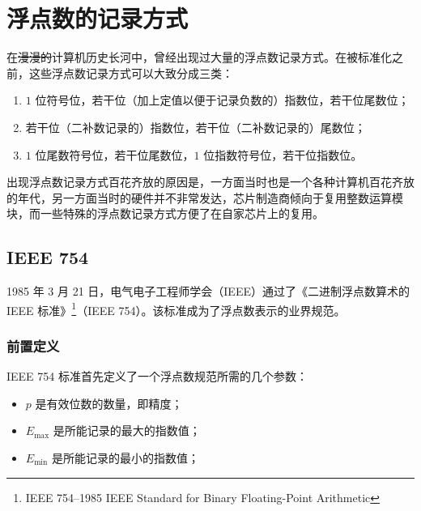 \section{浮点数的记录方式}\label{sec:NumberSystemBasics/FloatingPointNotations}
    在\sout{漫漫的}计算机历史长河中，曾经出现过大量的浮点数记录方式。在被标准化之前，这些浮点数记录方式可以大致分成三类\cite{jjgsavard-2005-cp0201}：
    \begin{enumerate}
        \item $1$ 位符号位，若干位（加上定值以便于记录负数的）指数位，若干位尾数位；
        \item 若干位（二补数记录的）指数位，若干位（二补数记录的）尾数位；
        \item $1$ 位尾数符号位，若干位尾数位，$1$ 位指数符号位，若干位指数位。
    \end{enumerate}
    出现浮点数记录方式百花齐放的原因是，一方面当时也是一个各种计算机百花齐放的年代，另一方面当时的硬件并不非常发达，芯片制造商倾向于复用整数运算模块，而一些特殊的浮点数记录方式方便了在自家芯片上的复用。

    \subsection{IEEE 754}\label{subsec:NumberSystemBasics/FloatingPointNotations/IEEE754}
        1985 年 3 月 21 日，电气电子工程师学会（IEEE）通过了《二进制浮点数算术的 IEEE 标准》\footnote{IEEE 754--1985 IEEE Standard for Binary Floating-Point Arithmetic\cite{ieee754-1985}}（IEEE 754）。该标准成为了浮点数表示的业界规范。

        \subsubsection{前置定义}\label{subsubsec:NumberSystemBasics/FloatingPointNotations/IEEE754/PreDefinitions}
            IEEE 754 标准首先定义了一个浮点数规范所需的几个参数：
            \begin{itemize}
                \item $p$ 是有效位数的数量，即精度；
                \item $E_{\max}$ 是所能记录的最大的指数值；
                \item $E_{\min}$ 是所能记录的最小的指数值；
            \end{itemize}

